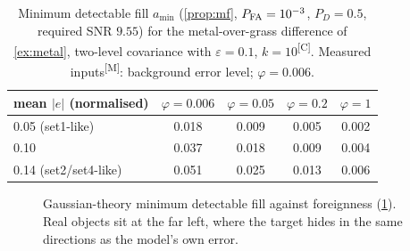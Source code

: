 \documentclass[11pt,a4paper]{article}
\theoremstyle{plain}
\theoremstyle{definition}
\theoremstyle{remark}
\newcommand{\dv}{\B{d}}
\newcommand{\meas}{\textsuperscript{\textsf{\scriptsize[M]}}}
\newcommand{\comp}{\textsuperscript{\textsf{\scriptsize[C]}}}
\begin{document}
\begin{table}[ht]
\centering\small
\caption{Minimum detectable fill $a_{\min}$ (\cref{prop:mf}, $P_{\rm FA}=10^{-3}$, $P_D=0.5$, required SNR $9.55$)
for the metal-over-grass difference of \cref{ex:metal}, two-level covariance with $\varepsilon=0.1$,
$k=10$\comp. Measured inputs\meas: background error level; $\varphi=0.006$.}
\label{tab:amin}
\begin{tabular}{@{}lcccc@{}}
\toprule
mean $|e|$ (normalised) & $\varphi=0.006$ & $\varphi=0.05$ & $\varphi=0.2$ & $\varphi=1$ \\
\midrule
0.05 (set1-like) & 0.018 & 0.009 & 0.005 & 0.002\\
0.10 & 0.037 & 0.018 & 0.009 & 0.004\\
0.14 (set2/set4-like) & 0.051 & 0.025 & 0.013 & 0.006\\
\bottomrule
\end{tabular}
\end{table}

\begin{figure}[ht]
\centering
{}
\caption{Gaussian-theory minimum detectable fill against foreignness (\cref{tab:amin}). Real objects sit at the far
left, where the target hides in the same directions as the model's own error.}
\label{fig:amin}
\end{figure}
\end{document}
